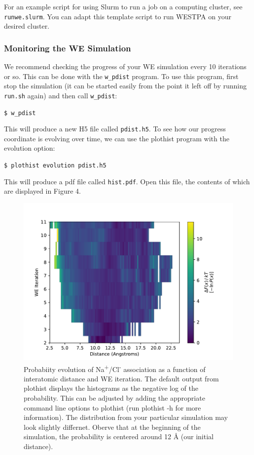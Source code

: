 \documentclass[9pt,tutorial,ASAPversion]{livecoms}
\begin{document}
For an example script for using Slurm to run a job on a computing cluster, see \verb|runwe.slurm|. 
You can adapt this template script to run WESTPA on your desired cluster.  

\subsubsection{Monitoring the WE Simulation}

We recommend checking the progress of your WE simulation every 10 iterations or so. 
This can be done with the \verb|w_pdist| program. To use this program, first stop the simulation (it can be started easily from the point it left off by running \verb|run.sh| again) and then call \verb|w_pdist|:
 
\verb|$ w_pdist|
 
This will produce a new H5 file called \verb|pdist.h5|. 
To see how our progress coordinate is evolving over time, we can use the plothist program with the evolution option:
 
\verb|$ plothist evolution pdist.h5|

This will produce a pdf file called \verb|hist.pdf|. 
Open this file, the contents of which are displayed in Figure 4. 

\begin{figure}
\includegraphics[width=\linewidth]{Figure4.pdf}
\caption{Probabiity evolution of Na\textsuperscript{+}/Cl\textsuperscript{-} association as a function of interatomic distance and WE iteration. 
The default output from plothist displays the histograms as the negative log of the probability. 
This can be adjusted by adding the appropriate command line options to plothist (run plothist -h for more information). 
The distribution from your particular simulation may look slightly differnet. 
Oberve that at the beginning of the simulation, the probability is centered around 12 \AA{} (our initial distance).}
\label{fig:view}
\end{figure}
\end{document}
